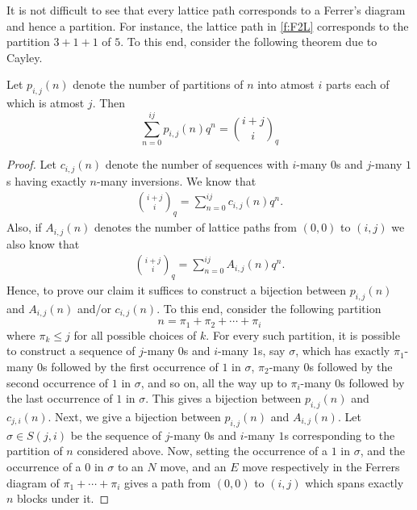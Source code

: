 It is not difficult to see that every lattice path corresponds to a Ferrer's diagram and hence a partition. For instance, the lattice path in \cref{f:F2L} corresponds to the partition $3+1+1$ of $5$. To this end, consider the following theorem due to Cayley.
\begin{theorem}
Let $p_{i,j}\left( n \right)$ denote the number of partitions of $n$ into atmost $i$ parts each of which is atmost $j$. Then \[
	\sum_{n=0}^{ij}p_{i,j}\left( n \right) q^n = \binom{i+j}{i}_q 
\]     
\end{theorem}
\begin{proof}
Let $c_{i,j}\left( n \right)$ denote the number of sequences with $i$-many $0$s and $j$-many $1$s having exactly $n$-many inversions. We know that
\begin{align*}
	\binom{i+j}{i}_q = \sum_{n=0}^{ij}c_{i,j}\left( n \right)q^n.
\end{align*}
Also, if $A_{i,j}\left( n \right)$ denotes the number of lattice paths from $\left( 0,0 \right)$ to $\left( i,j \right)$ we also know that
\begin{align*}
	\binom{i+j}{i}_{q} = \sum_{n=0}^{ij}A_{i,j}\left( n \right)q^n.
\end{align*}
Hence, to prove our claim it suffices to construct a bijection between $p_{i,j}\left( n \right)$ and $A_{i,j}\left( n \right)$ and/or $c_{i,j}\left( n \right)$. To this end, consider the following partition \[
	n = \pi_{1}+\pi_{2}+\cdots+\pi_{i}
\]
where $\pi_{k}\leq j$ for all possible choices of $k$. For every such partition, it is possible to construct a sequence of $j$-many $0$s and $i$-many $1$s, say $\sigma$, which has exactly $\pi_{1}$-many $0$s followed by the first occurrence of $1$ in $\sigma$, $\pi_{2}$-many $0$s followed by the second occurrence of $1$ in $\sigma$, and so on, all the way up to $\pi_{i}$-many $0$s followed by the last occurrence of $1$ in $\sigma$. This gives a bijection between $p_{i,j}\left( n \right)$ and $c_{j,i}\left( n \right)$. Next, we give a bijection between $p_{i,j}\left( n \right)$ and $A_{i,j}\left( n \right)$. Let $\sigma \in S\left(j,i\right)$ be the sequence of $j$-many $0$s and  $i$-many $1$s corresponding to the partition of $n$ considered above. Now, setting the occurrence of a $1$ in $\sigma$, and the occurrence of a $0$ in $\sigma$ to an $N$ move, and an $E$ move respectively in the Ferrers diagram of $\pi_{1}+\cdots+\pi_{i}$ gives a path from $\left( 0,0 \right)$ to $\left( i,j \right)$ which spans exactly $n$ blocks under it.
\end{proof}
